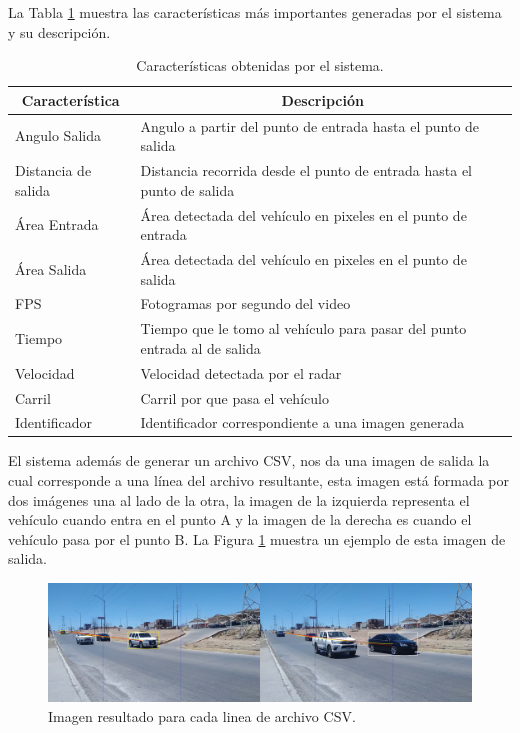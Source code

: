 La Tabla \ref{tab:CaracteristicasSistema} muestra las características más importantes generadas por el sistema y su descripción.

\begin{table}[H]
    \caption{Características obtenidas por el sistema.}
    \label{tab:CaracteristicasSistema}
    \begin{tabular}{|l|l|}
        \hline
        \multicolumn{1}{|c|}{\textbf{Característica}} & \multicolumn{1}{c|}{\textbf{Descripción}} \\ \hline

        Angulo Salida & Angulo a partir del punto de entrada hasta el punto de salida \\ \hline
        Distancia de salida & Distancia recorrida desde el punto de entrada hasta el punto de salida \\ \hline
        Área Entrada & Área detectada del vehículo en pixeles en el punto de entrada \\ \hline
        Área Salida & Área detectada del vehículo en pixeles en el punto de salida \\ \hline
        FPS & Fotogramas por segundo del video \\ \hline
        Tiempo & Tiempo que le tomo al vehículo para pasar del punto entrada al de salida \\ \hline
        Velocidad & Velocidad detectada por el radar \\ \hline
        Carril & Carril por que pasa el vehículo \\ \hline
        Identificador & Identificador correspondiente a una imagen generada \\ \hline
    \end{tabular}
\end{table}


El sistema además de generar un archivo CSV, nos da una imagen de salida la cual corresponde a una línea del archivo resultante, esta imagen está formada por dos imágenes una al lado de la otra, la imagen de la izquierda representa el vehículo cuando entra en el punto A y la imagen de la derecha es cuando el vehículo pasa por el punto B. La Figura \ref{fig:Completo} muestra un ejemplo de esta imagen de salida.

\begin{figure}[H]
    \centering
    \includegraphics[width=1\textwidth]{Metodologia/imgs/Completo.jpg}
    \caption{Imagen resultado para cada linea de archivo CSV.}
    \label{fig:Completo}
\end{figure}

